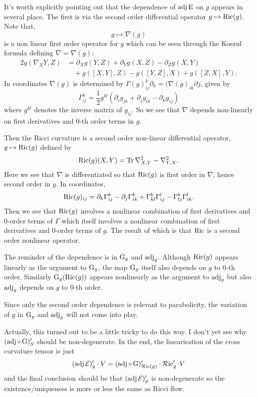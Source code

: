 \documentclass[a4paper, 12pt]{amsart}
\begin{document}
\begin{rem}
It's worth explicitly pointing out that the dependence of \(\operatorname{adj}\operatorname{E}\) on \(g\) appears in several place. The first is via the second order differential operator \(g \mapsto \operatorname{Ric}(g)\). Note that,
\[
g \mapsto \nabla(g)
\]
is a non linear first order operator for \(g\) which can be seen through the Koszul formula defining \(\nabla = \nabla(g)\):
\[
\begin{split}
2 g(\nabla_X Y, Z) &= \partial_X g(Y, Z) + \partial_Y g(X, Z) - \partial_Z g(X, Y) \\
&\quad + g([X, Y], Z) - g([Y, Z], X) + g([Z, X], Y).
\end{split}
\]
In coordinates \(\nabla(g)\) is determined by \(\Gamma(g)_{ij}^k \partial_k = (\nabla(g)_{\partial i} \partial j\), given by
\[
\Gamma_{ij}^k = \frac{1}{2} g^{kl} \left(\partial_i g_{jk} + \partial_j g_{ik} - \partial_k g_{ij}\right)
\]
where \(g^{kl}\) denotes the inverse matrix of \(g_{ij}\). So we see that \(\nabla\) depends non-linearly on first derivatives and \(0\)-th order terms in \(g\).

Then the Ricci curvature is a second order non-linear differential operator, \(g \mapsto \operatorname{Ric}(g)\) defined by
\[
\operatorname{Ric}(g) (X, Y) = \operatorname{Tr} \nabla^2_{X,Y} - \nabla^2_{Y,X}.
\]
Here we see that \(\nabla\) is differentiated so that \(\operatorname{Ric}(g)\) is first order in \(\nabla\), hence second order in \(g\). In coordinates,
\[
\operatorname{Ric}(g)_{ij} = \partial_k \Gamma^k_{ij} - \partial_j \Gamma^k_{ik} + \Gamma^k_{kl} \Gamma^l_{ij} - \Gamma^k_{lj} \Gamma^l_{ik}.
\]
Then we see that \(\operatorname{Ric}(g)\) involves a nonlinear combination of first derivatives and \(0\)-order terms of \(\Gamma\) which itself involves a nonlinear combination of first derivatives and \(0\)-order terms of \(g\). The result of which is that \(\operatorname{Ric}\) is a second order nonlinear operator.

The reminder of the dependence is in \(\operatorname{G}_g\) and \(\operatorname{adj}_g\). Although \(\operatorname{Ric}(g)\) appears linearly as the argument to \(\operatorname{G}_g\), the map \(\operatorname{G}_g\) itself also depends on \(g\) to \(0\)-th order. Similarly \(\operatorname{G}_g(\operatorname{Ric}(g))\) appears nonlinearly as the argument to \(\operatorname{adj}_g\) but also \(\operatorname{adj}_g\) depends on \(g\) to \(0\)-th order.

Since only the second order dependence is relevant to parabolicity, the variation of \(g\) in \(\operatorname{G}_g\) and \(\operatorname{adj}_g\) will not come into play.
\end{rem}

{\color{red} Actually, this turned out to be a little tricky to do this way. I don't yet see why \((\operatorname{adj} \circ \operatorname{G})'_S\) should be non-degenerate. In the end, the linearisation of the cross curvature tensor is just \[(\operatorname{adj}\operatorname{\mathcal{E}})'_g \cdot V = (\operatorname{adj} \circ \operatorname{G})'_{\operatorname{\mathcal{R}ic}(g)} \cdot \operatorname{\mathcal{R}ic}'_g \cdot V\] and the final conclusion should be that \((\operatorname{adj}\operatorname{\mathcal{E}})'_g\) is non-degenerate so the existence/uniqueness is more or less the same as Ricci flow.}
\end{document}
